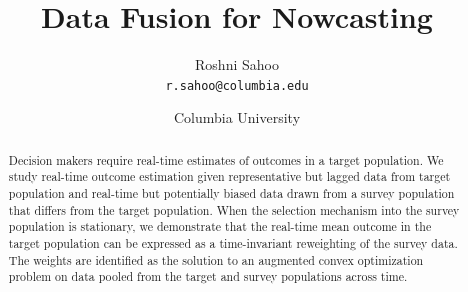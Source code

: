 \documentclass{article}
\author{Roshni Sahoo\\
  \texttt{r.sahoo@columbia.edu}}
\title{Data Fusion for Nowcasting}
\date{Columbia University}
\theoremstyle{definition}
\theoremstyle{plain}
\theoremstyle{remark}
\begin{document}
\maketitle

\begin{abstract}
Decision makers require real-time estimates of outcomes in a target population. We study real-time outcome estimation given representative but lagged data from target population and real-time but potentially biased data drawn from a survey population that differs from the target population. When the selection mechanism into the survey population is stationary, we demonstrate that the real-time mean outcome in the target population can be expressed as a time-invariant reweighting of the survey data. The weights are identified as the solution to an augmented convex optimization problem on data pooled from the target and survey populations across time.
\end{abstract}






\end{document}
